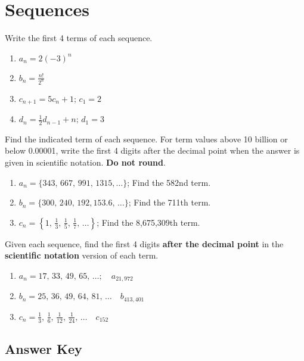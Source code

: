 \chapter{Sequences}

Write the first 4 terms of each sequence.
\begin{enumerate}
	\item $a_n = 2(-3)^n$
	\item $b_n = \frac{n!}{2^n}$
	\item $c_{n+1} = 5c_n + 1; \, c_1 = 2$
	\item $d_{n} = \frac{1}{2}d_{n-1} + n; \, d_1 = 3$
\end{enumerate}	\setcounter{Review}{\value{enumi}}

Find the indicated term of each sequence. For term values above 10 billion or below 0.00001, write the first 4 digits after the decimal point when the answer is given in scientific notation. \textbf{Do not round}.
\begin{enumerate}   \setcounter{enumi}{\value{Review}}
    \item $a_n = \{343, \, 667, \, 991, \, 1315, \dots\}$; Find the 582nd term.
    \item $b_n = \{300, \, 240, \, 192, 153.6, \, \dots\}$; Find the 711th term.
    \item $c_n = \left\{ 1, \, \frac{1}{3}, \, \frac{1}{5}, \, \frac{1}{7}, \, \dots\right\}$; Find the 8,675,309th term.
    \end{enumerate}
    \setcounter{Review}{\value{enumi}}
    
Given each sequence, find the first 4 digits \textbf{after the decimal point} in the \textbf{scientific notation} version of each term. 
\begin{enumerate}	\setcounter{enumi}{\value{Review}}
	\item $a_n = 17, \, 33, \, 49, \, 65, \, \dots; \quad a_{21,972}$
	\item $b_n = 25, \, 36, \, 49, \, 64, \, 81, \, \dots \quad b_{413,401}$
	\item $c_n = \frac{1}{3}, \, \frac{1}{6}, \, \frac{1}{12}, \, \frac{1}{24}, \, \dots \quad c_{152}$
\end{enumerate}	\setcounter{Review}{\value{enumi}}

\newpage

\section{Answer Key}

